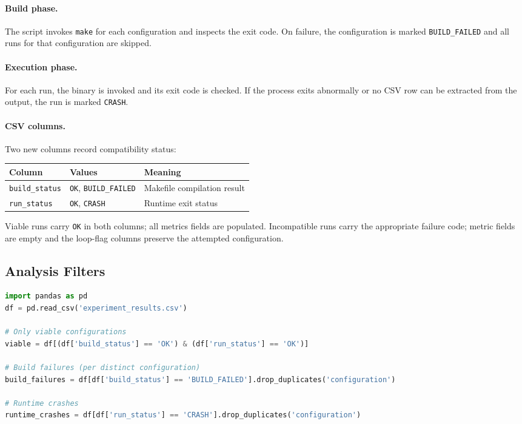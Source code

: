 \paragraph{Build phase.}
The script invokes \texttt{make} for each configuration and inspects the exit
code. On failure, the configuration is marked \texttt{BUILD\_FAILED} and all
runs for that configuration are skipped.

\paragraph{Execution phase.}
For each run, the binary is invoked and its exit code is checked. If the
process exits abnormally or no CSV row can be extracted from the output, the
run is marked \texttt{CRASH}.

\paragraph{CSV columns.}
Two new columns record compatibility status:

\begin{center}
\begin{tabular}{lll}
\toprule
Column & Values & Meaning \\
\midrule
\texttt{build\_status} & \texttt{OK}, \texttt{BUILD\_FAILED} & Makefile compilation result \\
\texttt{run\_status}   & \texttt{OK}, \texttt{CRASH}         & Runtime exit status \\
\bottomrule
\end{tabular}
\end{center}

Viable runs carry \texttt{OK} in both columns; all metrics fields are
populated. Incompatible runs carry the appropriate failure code; metric fields
are empty and the loop-flag columns preserve the attempted configuration.

\subsection{Analysis Filters}

\begin{lstlisting}[language=Python]
import pandas as pd
df = pd.read_csv('experiment_results.csv')

# Only viable configurations
viable = df[(df['build_status'] == 'OK') & (df['run_status'] == 'OK')]

# Build failures (per distinct configuration)
build_failures = df[df['build_status'] == 'BUILD_FAILED'].drop_duplicates('configuration')

# Runtime crashes
runtime_crashes = df[df['run_status'] == 'CRASH'].drop_duplicates('configuration')
\end{lstlisting}

